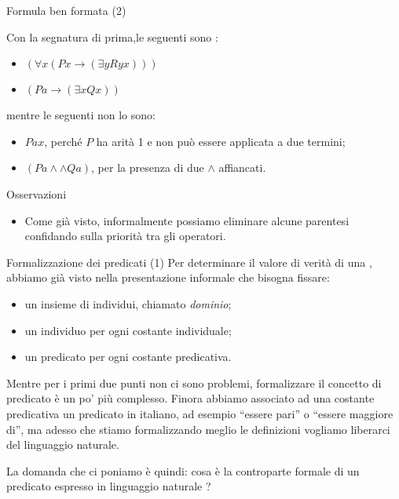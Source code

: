 \documentclass[aspectratio=169,10pt,dvipsnames,xcolor=table,handout]{beamer}
\begin{document}
\begin{frame}{Formula ben formata (2)}
    \begin{example}
        Con la segnatura di prima,le seguenti sono \fbf:
        \begin{itemize}
            \item $(\forall x (P x \to (\exists y Ryx)))$
            \item $(Pa \to (\exists x Qx))$
        \end{itemize}
        mentre le seguenti non lo sono:
        \begin{itemize}
            \item $Pax$, perché $P$ ha arità 1 e non può essere applicata a due termini;
            \item $(Pa \wedge \wedge Qa)$, per la presenza di due $\wedge$ affiancati.
        \end{itemize}
    \end{example}
    \begin{block}{Osservazioni}
        \begin{itemize}
            \item Come già visto, informalmente possiamo eliminare alcune parentesi confidando sulla priorità tra gli operatori.
        \end{itemize}
    \end{block}
\end{frame}

\begin{frame}{Formalizzazione dei predicati (1)}
    Per determinare il valore di verità di una \fbf, abbiamo già visto nella presentazione informale che bisogna fissare:
    \begin{itemize}
        \item un insieme di individui, chiamato \emph{dominio};
        \item un individuo per ogni costante individuale;
        \item un predicato per ogni costante predicativa.
    \end{itemize}

    \medskip
    Mentre per i primi due punti non ci sono problemi, formalizzare il concetto di predicato è un po' più complesso. Finora abbiamo associato ad una costante predicativa un predicato in italiano, ad esempio ``essere pari''  o ``essere maggiore di'', ma adesso che stiamo formalizzando meglio le definizioni vogliamo liberarci del linguaggio naturale.

    \medskip
    La domanda che ci poniamo è quindi: cosa è la controparte formale di un predicato espresso in linguaggio naturale ?
\end{frame}
\end{document}
